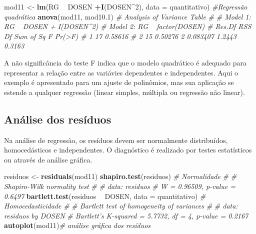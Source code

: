 \documentclass[
]{book}
\newenvironment{Shaded}{\begin{snugshade}}{\end{snugshade}}
\newcommand{\CommentTok}[1]{\textcolor[rgb]{0.56,0.35,0.01}{\textit{#1}}}
\newcommand{\DataTypeTok}[1]{\textcolor[rgb]{0.13,0.29,0.53}{#1}}
\newcommand{\DecValTok}[1]{\textcolor[rgb]{0.00,0.00,0.81}{#1}}
\newcommand{\FloatTok}[1]{\textcolor[rgb]{0.00,0.00,0.81}{#1}}
\newcommand{\KeywordTok}[1]{\textcolor[rgb]{0.13,0.29,0.53}{\textbf{#1}}}
\newcommand{\NormalTok}[1]{#1}
\newcommand{\OperatorTok}[1]{\textcolor[rgb]{0.81,0.36,0.00}{\textbf{#1}}}
\newcommand{\StringTok}[1]{\textcolor[rgb]{0.31,0.60,0.02}{#1}}
\begin{document}
\begin{Shaded}
\begin{Highlighting}[]
\NormalTok{mod11 <-}\StringTok{ }\KeywordTok{lm}\NormalTok{(RG }\OperatorTok{~}\StringTok{  }\NormalTok{DOSEN }\OperatorTok{+}\KeywordTok{I}\NormalTok{(DOSEN}\OperatorTok{^}\DecValTok{2}\NormalTok{), }\DataTypeTok{data =}\NormalTok{ quantitativo) }\CommentTok{#Regressão quadrática}
\KeywordTok{anova}\NormalTok{(mod11, mod10}\FloatTok{.1}\NormalTok{)}
\CommentTok{# Analysis of Variance Table}
\CommentTok{# }
\CommentTok{# Model 1: RG ~ DOSEN + I(DOSEN^2)}
\CommentTok{# Model 2: RG ~ factor(DOSEN)}
\CommentTok{#   Res.Df     RSS Df Sum of Sq      F Pr(>F)}
\CommentTok{# 1     17 0.58616                           }
\CommentTok{# 2     15 0.50276  2  0.083407 1.2443 0.3163}
\end{Highlighting}
\end{Shaded}

A não significância do teste F indica que o modelo quadrático é adequado para representar a relação entre as variávies dependentes e independentes. Aqui o exemplo é apresentado para um ajuste de polinômios, mas sua aplicação se estende a qualquer regressão (linear simples, múltipla ou regressão não linear).

\hypertarget{anuxe1lise-dos-resuxedduos}{%
\subsection{Análise dos resíduos}\label{anuxe1lise-dos-resuxedduos}}

Na análise de regressão, os resíduos  devem ser normalmente distribuídos, homocedásticos e independentes. O diagnóstico é realizado por testes estatísticos ou através de análise gráfica.

\begin{Shaded}
\begin{Highlighting}[]

\NormalTok{residuos <-}\StringTok{ }\KeywordTok{residuals}\NormalTok{(mod11)}
\KeywordTok{shapiro.test}\NormalTok{(residuos) }\CommentTok{# Normalidade}
\CommentTok{# }
\CommentTok{# 	Shapiro-Wilk normality test}
\CommentTok{# }
\CommentTok{# data:  residuos}
\CommentTok{# W = 0.96509, p-value = 0.6497}
\KeywordTok{bartlett.test}\NormalTok{(residuos }\OperatorTok{~}\StringTok{ }\NormalTok{DOSEN, }\DataTypeTok{data =}\NormalTok{ quantitativo) }\CommentTok{# Homocedasticidade}
\CommentTok{# }
\CommentTok{# 	Bartlett test of homogeneity of variances}
\CommentTok{# }
\CommentTok{# data:  residuos by DOSEN}
\CommentTok{# Bartlett's K-squared = 5.7732, df = 4, p-value = 0.2167}
\KeywordTok{autoplot}\NormalTok{(mod11)}\CommentTok{# análise gráfica dos resíduos}
\end{Highlighting}
\end{Shaded}
\end{document}
